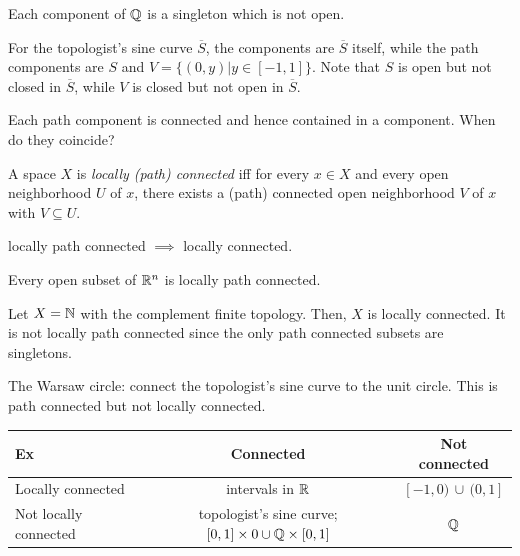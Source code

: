 \begin{example}
    Each component of $\mathbb{Q}$ is a singleton which is not open. 
\end{example}

\begin{example}
    For the topologist's sine curve $\overline{S}$, the components are $\overline{S}$ itself, while the path components are $S$ and $V=\{(0,y)|y\in [-1,1]\}$. Note that $S$ is open but not closed in $\overline{S}$, while $V$ is closed but not open in $\overline{S}$.
\end{example}

Each path component is connected and hence contained in a component. When do they coincide?

\begin{definition}
    A space $X$ is \emph{locally (path) connected} iff for every $x\in X$ and every open neighborhood $U$ of $x$, there exists a (path) connected open neighborhood $V$ of $x$ with $V\subseteq U$.
\end{definition}

\begin{remark}
    locally path connected $\implies$ locally connected.
\end{remark}

\begin{example}
    Every open subset of $\mathbb{R}^n$ is locally path connected.
\end{example}

\begin{example}
    Let $X=\mathbb{N}$ with the complement finite topology. Then, $X$ is locally connected. It is not locally path connected since the only path connected subsets are singletons.
\end{example}

\begin{example}
    The Warsaw circle: connect the topologist's sine curve to the unit circle. This is path connected but not locally connected.
\end{example}

\begin{center}
\begin{tabular}{|l|c|c|}
\hline
\textbf{Ex} & \textbf{Connected} & \textbf{Not connected} \\
\hline
Locally connected
& intervals in $\mathbb{R}$
& $[-1,0)\,\cup\,(0,1]$ \\
\hline
Not locally connected
& topologist's sine curve; $[0,1]\times 0 \cup \mathbb{Q} \times [0,1]$
& $\mathbb{Q}$ \\
\hline
\end{tabular}
\end{center}



